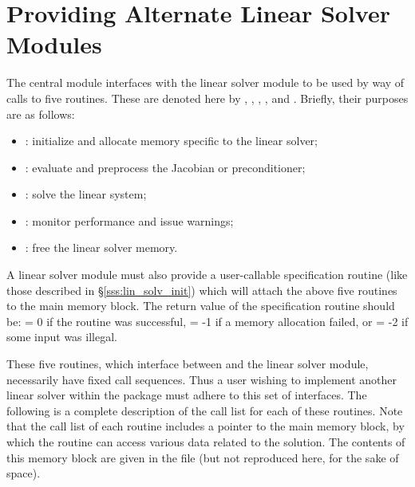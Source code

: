\chapter{Providing Alternate Linear Solver Modules}\label{s:new_linsolv}
The central {\ida} module interfaces with the linear solver module to be
used by way of calls to five routines.  These are denoted here by 
, , , , and .
Briefly, their purposes are as follows:
\begin{itemize}
\item {}: initialize and allocate memory specific to the
  linear solver;
\item {}: evaluate and preprocess the Jacobian or preconditioner;
\item {}: solve the linear system;
\item {}: monitor performance and issue warnings;
\item {}: free the linear solver memory.
\end{itemize}
A linear solver module must also provide a user-callable specification routine
(like those described in \S\ref{sss:lin_solv_init}) which will attach
the above five routines to the main {\ida} memory block. The return value of the
specification routine should be:  = 0 if the routine was successful,
 = -1 if a memory allocation failed, or  = -2
if some input was illegal.

These five routines, which interface between {\ida} and the linear solver module,
necessarily have fixed call sequences.  Thus a user wishing to implement another 
linear solver within the {\ida} package must adhere to this set of interfaces.
The following is a complete description of the call list for each of
these routines.  Note that the call list of each routine includes a
pointer to the main {\ida} memory block, by which the routine can access
various data related to the {\ida} solution.  The contents of this memory
block are given in the file  (but not reproduced here, for
the sake of space).



